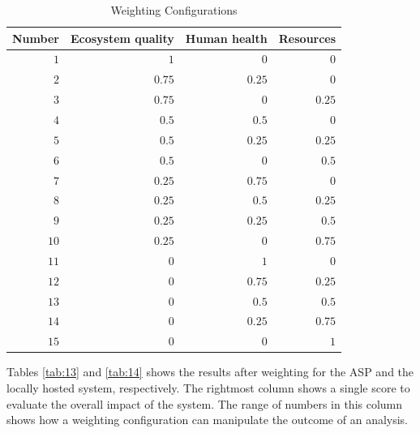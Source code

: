 \documentclass[final,journal,10pt,letterpaper,oneside,twocolumn,compsoc]%
{IEEEtran}
\begin{document}
\begin{table}[t!]
  \caption{Weighting Configurations}
  \label{tab:12}
  \centering
    \begin{tabular}{| r | r | r | r |}
      \hline
      Number & Ecosystem quality & Human health & Resources \\
      \hline
      $1$  & $1$    & $0$    & $0$    \\
      $2$  & $0.75$ & $0.25$ & $0$    \\
      $3$  & $0.75$ & $0$    & $0.25$ \\
      $4$  & $0.5$  & $0.5$  & $0$    \\
      $5$  & $0.5$  & $0.25$ & $0.25$ \\
      $6$  & $0.5$  & $0$    & $0.5$  \\
      $7$  & $0.25$ & $0.75$ & $0$    \\
      $8$  & $0.25$ & $0.5$  & $0.25$ \\
      $9$  & $0.25$ & $0.25$ & $0.5$  \\
      $10$ & $0.25$ & $0$    & $0.75$ \\
      $11$ & $0$    & $1$    & $0$    \\
      $12$ & $0$    & $0.75$ & $0.25$ \\
      $13$ & $0$    & $0.5$  & $0.5$  \\
      $14$ & $0$    & $0.25$ & $0.75$ \\
      $15$ & $0$    & $0$    & $1$    \\
      \hline
    \end{tabular}
\end{table}

Tables \ref{tab:13} and \ref{tab:14} shows the results after weighting for the ASP and the locally
hosted system, respectively. The rightmost column shows a single score to
evaluate the overall impact of the system. The range of numbers in this column
shows how a weighting configuration can manipulate the outcome of an analysis.
\end{document}
